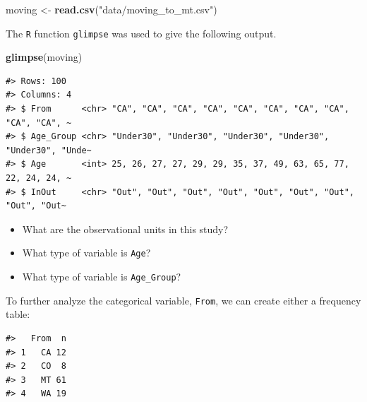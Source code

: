 \documentclass[
]{report}
\newenvironment{Shaded}{\begin{snugshade}}{\end{snugshade}}
\newcommand{\FunctionTok}[1]{\textcolor[rgb]{0.13,0.29,0.53}{\textbf{#1}}}
\newcommand{\NormalTok}[1]{#1}
\newcommand{\OtherTok}[1]{\textcolor[rgb]{0.56,0.35,0.01}{#1}}
\newcommand{\StringTok}[1]{\textcolor[rgb]{0.31,0.60,0.02}{#1}}
\providecommand{\tightlist}{%
  \setlength{\itemsep}{0pt}\setlength{\parskip}{0pt}}
\begin{document}
\begin{Shaded}
\begin{Highlighting}[]
\NormalTok{moving }\OtherTok{\textless{}{-}} \FunctionTok{read.csv}\NormalTok{(}\StringTok{"data/moving\_to\_mt.csv"}\NormalTok{)}
\end{Highlighting}
\end{Shaded}

The \texttt{R} function \texttt{glimpse} was used to give the following output.

\begin{Shaded}
\begin{Highlighting}[]
\FunctionTok{glimpse}\NormalTok{(moving)}
\end{Highlighting}
\end{Shaded}

\begin{verbatim}
#> Rows: 100
#> Columns: 4
#> $ From      <chr> "CA", "CA", "CA", "CA", "CA", "CA", "CA", "CA", "CA", "CA", ~
#> $ Age_Group <chr> "Under30", "Under30", "Under30", "Under30", "Under30", "Unde~
#> $ Age       <int> 25, 26, 27, 27, 29, 29, 35, 37, 49, 63, 65, 77, 22, 24, 24, ~
#> $ InOut     <chr> "Out", "Out", "Out", "Out", "Out", "Out", "Out", "Out", "Out~
\end{verbatim}

\begin{itemize}
\tightlist
\item
  What are the observational units in this study?
\end{itemize}

\vspace{0.3in}

\begin{itemize}
\tightlist
\item
  What type of variable is \texttt{Age}?
\end{itemize}

\vspace{0.3in}

\begin{itemize}
\tightlist
\item
  What type of variable is \texttt{Age\_Group}?
\end{itemize}

To further analyze the categorical variable, \texttt{From}, we can create either a frequency table:

\begin{verbatim}
#>   From  n
#> 1   CA 12
#> 2   CO  8
#> 3   MT 61
#> 4   WA 19
\end{verbatim}
\end{document}
